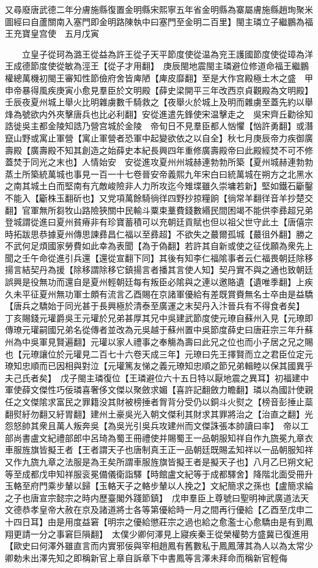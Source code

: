 又尋廢唐武德二年分膚施縣復置金明縣宋熙寧五年省金明縣為寨屬膚施縣趙珣聚米圖經曰自蘆關南入塞門即金明路陳執中曰塞門至金明二百里】閩主璘立子繼鵬為福王充寶皇宫使　五月戊寅

　　立皇子從珂為潞王從益為許王從子天平節度使從温為兖王護國節度使從璋為洋王成德節度使從敏為涇王【從子才用翻】　庚辰閩地震閩主璘避位修道命福王繼鵬權總萬機初閩王審知性節儉府舍皆庳陋【庳皮靡翻】至是大作宫殿極土木之盛　甲申帝暴得風疾庚寅小愈見羣臣於文明殿【薛史梁開平三年改西京貞觀殿為文明殿】　壬辰夜夏州城上舉火比明雜虜數千騎救之【夜舉火於城上及明而雜虜至蓋先約以舉烽為號欲内外夾擊唐兵也比必利翻】安從進遣先鋒使宋温擊走之　吳宋齊丘勸徐知誥徙吳主都金陵知誥乃營宫城於金陵　帝旬日不見羣臣都人忷懼【忷許勇翻】或潛竄山野或寓止軍營【寓止軍營者恐軍中起變欲依之以自全】秋七月庚辰帝力疾御廣壽殿【廣壽殿不知其創造之始薛史本紀長興四年重修廣壽殿帝曰此殿經焚不可不修蓋焚于同光之末也】人情始安　安從進攻夏州州城赫連勃勃所築【夏州城赫連勃勃蒸土所築統萬城也事見一百一十七卷晉安帝義熙九年宋白曰統萬城在朔方之北黑水之南其城土白而堅南有亢敵峻險非人力所攻迄今雉堞雖久崇墉若新】堅如鐵石斸鑿不能入【斸株玉翻斫也】又党項萬餘騎徜徉四野抄掠糧餉【徜常羊翻徉音羊抄楚交翻】官軍無所芻牧山路險狹關中民輸斗粟束藳費錢數緡民間困竭不能供李彞超兄弟登城謂從進曰夏州貧瘠非有珍寶蓄積可以充朝廷貢賦也但以祖父世守此土【唐僖宗時拓跋思恭據夏州傳思諫彞昌仁福以至彞超】不欲失之蕞爾孤城【蕞徂外翻】勝之不武何足煩國家勞費如此幸為表聞【為于偽翻】若許其自新或使之征伐願為衆先上聞之壬午命從進引兵還【還從宣翻下同】其後有知李仁福隂事者云仁福畏朝廷除移揚言結契丹為援【除移謂除移它鎮揚言者播其言使人知】契丹實不與之通也致朝廷誤興是役無功而還自是夏州輕朝廷每有叛臣必隂與之連以邀賂遺【遺唯季翻】上疾久未平征夏州無功軍士頗有流言乙酉賜在京諸軍優給有差既賞賚無名士卒由是益驕【唐兵之驕始于同光甚于長興極於清泰至廣運之末契丹入汴晉兵有不得食者矣】　丁亥賜錢元瓘爵吳王元瓘於兄弟甚厚其兄中吳建武節度使元璙自蘇州入見【元璙即傳璙元瓘嗣國兄弟名從傳者並改為元吳越于蘇州置中吳節度薛史曰唐莊宗三年升蘇州為中吳軍見賢遍翻】元瓘以家人禮事之奉觴為壽曰此兄之位也而小子居之兄之賜也【元璙讓位於元瓘見二百七十六卷天成三年】元璙曰先王擇賢而立之君臣位定元璙知忠順而已因相與對泣【元瓘篤友悌之義元璙知忠順之節兄弟輯睦以保其國異乎夫己氏者矣】　戊子閩主璘復位【王璘避位六十五日特以厭地震之異耳】初福建中軍使薛文傑性巧佞璘喜奢侈文傑以聚斂求媚【喜許記翻斂力瞻翻】璘以為國計使親任之文傑隂求富民之罪籍没其財被榜捶者胷背分受仍以銅斗火熨之【榜音彭捶止蘂翻熨紆勿翻又紆胃翻】建州土豪吳光入朝文傑利其財求其罪將治之【治直之翻】光怨怒帥其衆且萬人叛奔吳【為吳光引吳兵攻建州而文傑誅張本帥讀曰率】　帝以工部尚書盧文紀禮部郎中呂琦為蜀王冊禮使并賜蜀王一品朝服知祥自作九旒冕九章衣車服旌旗皆擬王者【王者謂天子也唐制真王正一品朝廷既賜孟知祥以一品朝服知祥又作九旒九章之法服是為王矣所謂車服旌旗皆擬王者是擬天子也】八月乙巳朔文紀等至成都戊申知祥服衮冕備儀衛詣驛【時館盧文紀等于成都驛舍】降階北面受冊升玉輅至府門乘步輦以歸【玉輅天子之輅步輦以人挽之】文紀簡求之孫也【盧簡求綸之子也唐宣宗懿宗之時内歷臺閣外踐節鎮】　戊申羣臣上尊號曰聖明神武廣道法天文德恭孝皇帝大赦在京及諸道將士各等第優給時一月之間再行優給【乙酉至戊申二十四日耳】由是用度益窘【明宗之優給懲莊宗之過也給之愈濫士心愈驕由是有到鳳翔更請一分之事窘巨隕翻】　太僕少卿何澤見上寢疾秦王從榮權勢方盛冀已復進用【歐史曰何澤外雖直言而内實邪佞與宰相趙鳳有舊數私于鳳鳳薄其為人以為太常少卿勅未出澤先知之即稱新官上章自訴章下中書鳳等言澤未拜命而稱新官輕侮